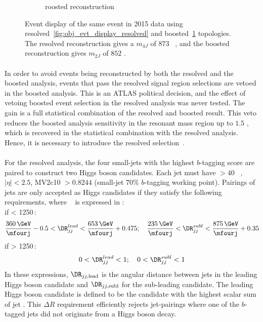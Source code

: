 \begin{figure}[htbp!]
\begin{subfigure}[b]{0.45\textwidth}
        \caption{roosted reconstruction}
        \label{fig:obj_evt_display_boosted}
    \end{subfigure}
\caption{Event display of the same event in 2015 data using resolved~\ref{fig:obj_evt_display_resolved} and  boosted~\ref{fig:obj_evt_display_boosted} topologies. The resolved reconstruction gives a $m_{4J}$ of $873$ \GeV~, and the boosted reconstruction gives $m_{2J}$ of $852$ \GeV. }
\label{fig:obj_evt_display}
\end{figure}

\paragraph{}
In order to avoid events being reconstructed by both the resolved and the boosted analysis, events that pass the resolved signal region selections are vetoed in the boosted analysis.
This is an ATLAS political decision, and the effect of vetoing boosted event selection in the resolved analysis was never tested.
The gain is a full statistical combination of the resolved and boosted result.
This veto reduces the boosted analysis sensitivity in the resonant mass region up to $1.5$ \TeV, which is recovered in the statistical combination with the resolved analysis.
Hence, it is necessary to introduce the resolved selection~\cite{Aaboud:2018knk}.

\paragraph{}
For the resolved analysis, the four small-\R jets with the highest $b$-tagging score are paired to construct two Higgs boson candidates.  
Each jet must have \pt $> 40$ \GeV~, $|\eta| < 2.5$, MV2c10 $> 0.8244$ (small-\R jet $70\%$ $b$-tagging working point). 
Pairings of jets are only accepted as Higgs candidates if they satisfy the following requirements, where \mfourj~ is expressed in \GeV:\\
if \mfourj  < 1250\,\GeV:
\begin{equation}
\frac{360\,\GeV}{\mfourj} - 0.5 < \DR_{jj}^{lead} < \frac{653\,\GeV}{\mfourj} + 0.475;\quad
\frac{235\,\GeV}{\mfourj} < \DR_{jj}^{subl}  < \frac{875\,\GeV}{\mfourj} + 0.35
\end{equation}
\quad if \mfourj  > 1250\,\GeV:
\begin{equation}
0< \DR_{jj}^{lead} < 1;\quad 0 < \DR_{jj}^{subl} < 1
\end{equation}
In these expressions, $\DR_{jj, \mathrm{lead}}$ is the angular distance between jets in the leading Higgs boson candidate and $\DR_{jj, \mathrm{subl}}$ for the sub-leading candidate. 
The leading Higgs boson candidate is defined to be the candidate with the highest scalar sum of jet \pt. 
This $\Delta R$ requirement efficiently rejects jet-pairings where one of the $b$-tagged jets did not originate from a Higgs boson decay.

